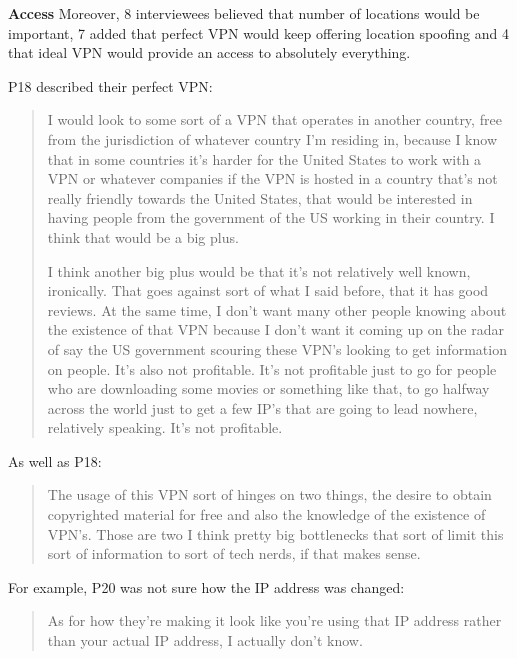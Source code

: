 \textbf{Access} Moreover, 8 interviewees believed that number of locations
would be important, 7 added that perfect VPN would keep offering location
spoofing and 4 that ideal VPN would provide an access to absolutely
everything.

P18 described their perfect VPN: \begin{quote}I would look to some sort of a
    VPN that operates in another country, free from the jurisdiction of
    whatever country I'm residing in, because I know that in some countries
    it's harder for the United States to work with a VPN or whatever companies
    if the VPN is hosted in a country that's not really friendly towards the
    United States, that would be interested in having people from the
    government of the US working in their country. I think that would be a big
    plus.


I think another big plus would be that it's not relatively well known,
ironically. That goes against sort of what I said before, that it has good
reviews. At the same time, I don't want many other people knowing about the
existence of that VPN because I don't want it coming up on the radar of say
the US government scouring these VPN's looking to get information on people.
It's also not profitable. It's not profitable just to go for people who are
downloading some movies or something like that, to go halfway across the world
just to get a few IP's that are going to lead nowhere, relatively speaking.
It's not profitable.\end{quote}



As well as P18: \begin{quote}The usage of this VPN sort of hinges on two
things, the desire to obtain copyrighted material for free and also the
knowledge of the existence of VPN's. Those are two I think pretty big
bottlenecks that sort of limit this sort of information to sort of tech nerds,
if that makes sense.\end{quote}

For example, P20 was not sure how the IP address was changed: \begin{quote} As for how they're making it look like you're using that IP
address rather than your actual IP address, I actually don't know.\end{quote}


